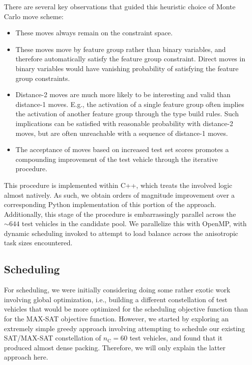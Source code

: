 \documentclass[aps,pra,twocolumn,superscriptaddress,groupedaddress]{revtex4}  %
\begin{document}
There are several key observations that guided this heuristic choice of Monte
Carlo move scheme:
\begin{itemize}
\item These moves always remain on the constraint space.
\item These moves move by feature group rather than binary variables, and
therefore automatically satisfy the feature group constraint. Direct moves in
binary variables would have vanishing probability of satisfying the feature
group constraints.
\item Distance-2 moves are much more likely to be interesting and valid than
distance-1 moves. E.g., the activation of a single feature group often implies
the activation of another feature group through the type build rules. Such
implications can be satisfied with reasonable probability with distance-2 moves,
but are often unreachable with a sequence of distance-1 moves.
\item The acceptance of moves based on increased test set scores promotes a
compounding improvement of the test vehicle through the iterative procedure.
\end{itemize}

This procedure is implemented within C++, which treats the involved logic almost
natively. As such, we obtain orders of magnitude improvement over a
corresponding Python implementation of this portion of the approach.
Additionally, this stage of the procedure is embarrassingly parallel across the
$\sim 644$ test vehicles in the candidate pool. We parallelize this with OpenMP,
with dynamic scheduling invoked to attempt to load balance across the
anisotropic task sizes encountered.


\subsection{Scheduling}

For scheduling, we were initially considering doing some rather exotic work
involving global optimization, i.e., building a different constellation of test
vehicles that would be more optimized for the scheduling objective function than
for the MAX-SAT objective function. However, we started by exploring an extremely
simple greedy approach involving attempting to schedule our existing SAT/MAX-SAT
constellation of $n_{\mathrm{C}} = 60$ test vehicles, and found that it produced
almost dense packing. Therefore, we will only explain the latter approach here. 
\end{document}
